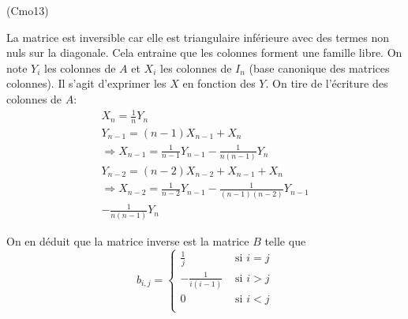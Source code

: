 \begin{tiny}(Cmo13)\end{tiny} La matrice est inversible car elle est triangulaire inférieure avec des termes non nuls sur la diagonale. Cela entraine que les colonnes forment une famille libre.\newline
On note $Y_i$ les colonnes de $A$ et $X_i$ les colonnes de $I_n$ (base canonique des matrices colonnes). Il s'agit d'exprimer les $X$ en fonction des $Y$. On tire de l'écriture des colonnes de $A$:
\begin{multline*}
 X_n=\frac{1}{n} Y_n\\
Y_{n-1}=(n-1)X_{n-1}+X_n\\
\Rightarrow X_{n-1}=\frac{1}{n-1}Y_{n-1}-\frac{1}{n(n-1)}Y_{n}\\
Y_{n-2}=(n-2)X_{n-2}+X_{n-1}+X_n\\
\Rightarrow X_{n-2}=\frac{1}{n-2}Y_{n-1}-\frac{1}{(n-1)(n-2)}Y_{n-1}\\-\frac{1}{n(n-1)}Y_{n}
\end{multline*}

 On en déduit que la matrice inverse est la matrice $B$ telle que
\begin{displaymath}
 b_{i,j}=
\left\lbrace 
\begin{aligned}
 \frac{1}{j} &\text{ si }i=j\\
 -\frac{1}{i(i-1)} &\text{ si }i>j\\
 0 &\text{ si }i<j\\
\end{aligned}
\right. 
\end{displaymath}

